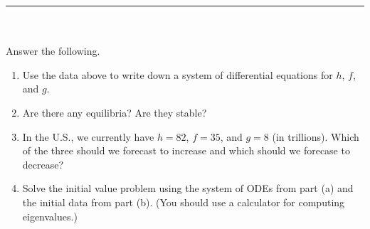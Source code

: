 \documentclass[12pt]{article}
\newcommand{\be}{\begin{enumerate}}
\newcommand{\ee}{\end{enumerate}}
\begin{document}
 \hrule
~ \\~\\
 Answer the following.
 \be
  \item Use the data above to write down a system of differential equations for $h$, $f$, and $g$.
  \item Are there any equilibria? Are they stable?
  \item In the U.S., we currently have $h=82$, $f=35$, and $g=8$ (in trillions). Which of the three should we forecast to increase and which should we forecase to decrease?
  \item Solve the initial value problem using the system of ODEs from part (a) and the initial data from part (b). (You should use a calculator for computing eigenvalues.)
 \ee
\end{document}
